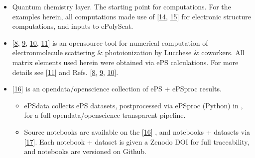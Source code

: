 \documentclass[letterpaper,10pt,english]{jupyterBook}
\begin{document}
\begin{itemize}
\item {} 
\sphinxAtStartPar
Quantum chemistry layer. The starting point for  computations. For the examples herein, all computations made use of  {[}\hyperlink{cite.backmatter/bibliography:id42}{14}, \hyperlink{cite.backmatter/bibliography:id44}{15}{]} for electronic structure computations, and inputs to ePolyScat.

\item {} 
\sphinxAtStartPar
{} {[}\hyperlink{cite.backmatter/bibliography:id63}{8}, \hyperlink{cite.backmatter/bibliography:id43}{9}, \hyperlink{cite.backmatter/bibliography:id66}{10}, \hyperlink{cite.backmatter/bibliography:id64}{11}{]} is an open\sphinxhyphen{}source tool for numerical computation of electron\sphinxhyphen{}molecule scattering \& photoionization by Lucchese \& coworkers. All matrix elements used herein were obtained via ePS calculations. For more details see  {[}\hyperlink{cite.backmatter/bibliography:id64}{11}{]} and Refs. {[}\hyperlink{cite.backmatter/bibliography:id63}{8}, \hyperlink{cite.backmatter/bibliography:id43}{9}, \hyperlink{cite.backmatter/bibliography:id66}{10}{]}.

\item {} 
\sphinxAtStartPar
{} {[}\hyperlink{cite.backmatter/bibliography:id54}{16}{]} is an open\sphinxhyphen{}data/open\sphinxhyphen{}science collection of ePS + ePSproc results.
\begin{itemize}
\item {} 
\sphinxAtStartPar
ePSdata collects ePS datasets, post\sphinxhyphen{}processed via ePSproc (Python) in , for a full open\sphinxhyphen{}data/open\sphinxhyphen{}science transparent pipeline.

\end{itemize}
\begin{itemize}
\item {} 
\sphinxAtStartPar
Source notebooks are available on the  {[}\hyperlink{cite.backmatter/bibliography:id54}{16}{]} , and notebooks + datasets via  {[}\hyperlink{cite.backmatter/bibliography:id55}{17}{]}. Each notebook + dataset is given a Zenodo DOI for full traceability, and notebooks are versioned on Github.


\end{itemize}
\end{itemize}
\end{document}
